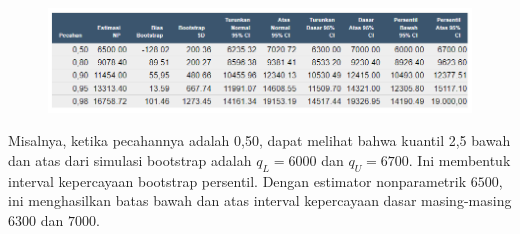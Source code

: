 \documentclass[
]{book}
\newenvironment{Shaded}{\begin{snugshade}}{\end{snugshade}}
\newcommand{\DecValTok}[1]{\textcolor[rgb]{0.00,0.00,0.81}{#1}}
\newcommand{\NormalTok}[1]{#1}
\newcommand{\OtherTok}[1]{\textcolor[rgb]{0.56,0.35,0.01}{#1}}
\newcommand{\SpecialCharTok}[1]{\textcolor[rgb]{0.00,0.00,0.00}{#1}}
\begin{document}
\begin{Shaded}
\end{Shaded}

\begin{figure}

{\centering \includegraphics[width=1\linewidth]{images/6.2.3-1} 

}

\end{figure}

Misalnya, ketika pecahannya adalah 0,50, dapat melihat bahwa kuantil 2,5 bawah dan atas dari simulasi bootstrap adalah \(q_L= 6000\) dan \(q_U= 6700\). Ini membentuk interval kepercayaan bootstrap persentil. Dengan estimator nonparametrik \(6500\), ini menghasilkan batas bawah dan atas interval kepercayaan dasar masing-masing \(6300\) dan \(7000\).
\end{document}
